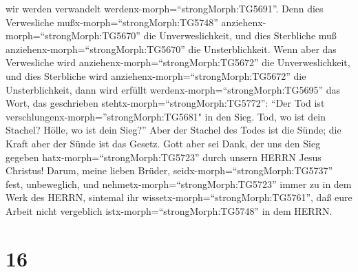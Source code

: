 wir werden verwandelt werdenx-morph=``strongMorph:TG5691''.
 Denn dies Verwesliche mußx-morph=``strongMorph:TG5748''
anziehenx-morph=``strongMorph:TG5670'' die Unverweslichkeit, und dies
Sterbliche muß anziehenx-morph=``strongMorph:TG5670'' die
Unsterblichkeit.  Wenn aber das Verwesliche wird
anziehenx-morph=``strongMorph:TG5672'' die Unverweslichkeit, und dies
Sterbliche wird anziehenx-morph=``strongMorph:TG5672'' die
Unsterblichkeit, dann wird erfüllt werdenx-morph=``strongMorph:TG5695''
das Wort, das geschrieben stehtx-morph=``strongMorph:TG5772'':
 ``Der Tod ist verschlungenx-morph=''strongMorph:TG5681" in
den Sieg. Tod, wo ist dein Stachel? Hölle, wo ist dein Sieg?''
 Aber der Stachel des Todes ist die Sünde; die Kraft aber
der Sünde ist das Gesetz.  Gott aber sei Dank, der uns den
Sieg gegeben hatx-morph=``strongMorph:TG5723'' durch unsern HERRN Jesus
Christus!  Darum, meine lieben Brüder,
seidx-morph=``strongMorph:TG5737'' fest, unbeweglich, und
nehmetx-morph=``strongMorph:TG5723'' immer zu in dem Werk des HERRN,
sintemal ihr wissetx-morph=``strongMorph:TG5761'', daß eure Arbeit nicht
vergeblich istx-morph=``strongMorph:TG5748'' in dem HERRN.

\hypertarget{section-15}{%
\section{16}\label{section-15}}

